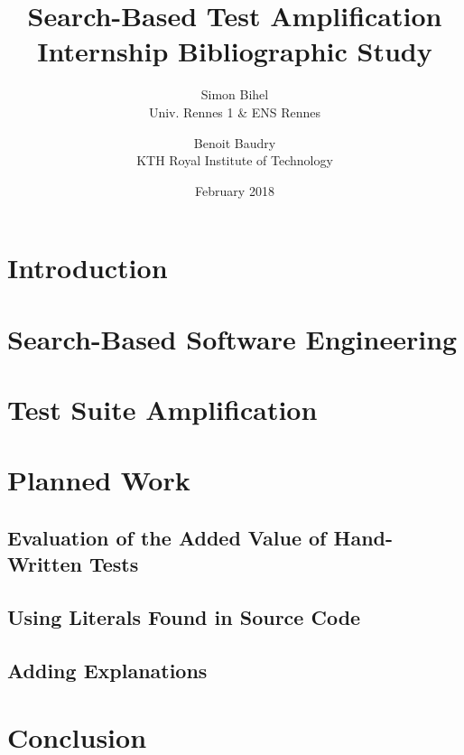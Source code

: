 \documentclass{proc}
\title{Search-Based Test Amplification \\
       \large Internship Bibliographic Study}
\author{%
  Simon Bihel \\ Univ. Rennes 1 \& ENS Rennes \\ \email{simon.bihel@ens-rennes.fr}%
  \and Benoit Baudry \\ KTH Royal Institute of Technology \\ \email{baudry@kth.se}%
}
\date{February 2018}
\begin{document}
\maketitle

\section*{Introduction}

\section{Search-Based Software Engineering}

\section{Test Suite Amplification}

\section{Planned Work}

\subsection{Evaluation of the Added Value of Hand-Written Tests}

\subsection{Using Literals Found in Source Code}

\subsection{Adding Explanations}

\section*{Conclusion}




\end{document}
